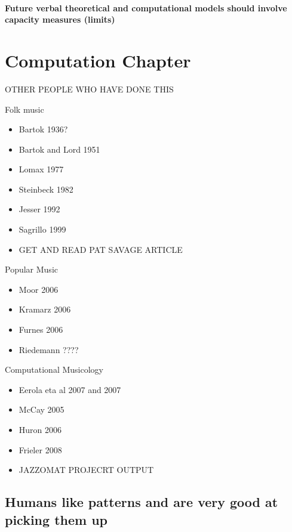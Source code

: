\documentclass[]{book}
\providecommand{\tightlist}{%
  \setlength{\itemsep}{0pt}\setlength{\parskip}{0pt}}
\theoremstyle{definition}
\theoremstyle{definition}
\theoremstyle{definition}
\theoremstyle{remark}
\begin{document}
\hypertarget{future-verbal-theoretical-and-computational-models-should-involve-capacity-measures-limits}{%
\subsubsection{Future verbal theoretical and computational models should
involve capacity measures
(limits)}\label{future-verbal-theoretical-and-computational-models-should-involve-capacity-measures-limits}}

\hypertarget{computation-chapter}{%
\chapter{Computation Chapter}\label{computation-chapter}}

OTHER PEOPLE WHO HAVE DONE THIS

Folk music

\begin{itemize}
\item
  Bartok 1936?
\item
  Bartok and Lord 1951
\item
  Lomax 1977
\item
  Steinbeck 1982
\item
  Jesser 1992
\item
  Sagrillo 1999
\item
  GET AND READ PAT SAVAGE ARTICLE
\end{itemize}

Popular Music

\begin{itemize}
\tightlist
\item
  Moor 2006
\item
  Kramarz 2006
\item
  Furnes 2006
\item
  Riedemann ????
\end{itemize}

Computational Musicology

\begin{itemize}
\tightlist
\item
  Eerola eta al 2007 and 2007
\item
  McCay 2005
\item
  Huron 2006
\item
  Frieler 2008
\item
  JAZZOMAT PROJECRT OUTPUT
\end{itemize}

\hypertarget{humans-like-patterns-and-are-very-good-at-picking-them-up}{%
\section{Humans like patterns and are very good at picking them
up}\label{humans-like-patterns-and-are-very-good-at-picking-them-up}}
\end{document}
